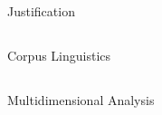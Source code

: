 Justification
\subsection{\citet{bardi_learning_2015}}
\subsection{\citet{baumvol_scholarly_2021}}
\subsection{\citet{belcher_seeking_2007}}
\subsection{\citet{cargill_introduction_2008}}
\subsection{\citet{hyland_scholarly_2025}}
\subsection{\citet{kaplan_cultural_1966}}
\subsection{\citet{severino_doodles_1993}}
\subsection{\citet{monteiro_periphery_2020}}
\subsection{\citet{ventura_desafiando_2024}}

Corpus Linguistics
\subsection{\citet{berber_sardinha_deus_2023}}

Multidimensional Analysis
\subsection{\citet{biber_variation_1988}}
\subsection{\citet{berber_sardinha_multi-dimensional_2019-1}}
